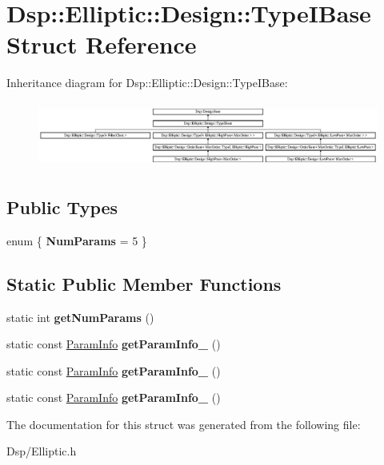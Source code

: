 \hypertarget{structDsp_1_1Elliptic_1_1Design_1_1TypeIBase}{\section{Dsp\-:\-:Elliptic\-:\-:Design\-:\-:Type\-I\-Base Struct Reference}
\label{structDsp_1_1Elliptic_1_1Design_1_1TypeIBase}
}
Inheritance diagram for Dsp\-:\-:Elliptic\-:\-:Design\-:\-:Type\-I\-Base\-:\begin{figure}[H]
\begin{center}
\leavevmode
\includegraphics[height=2.196079cm]{structDsp_1_1Elliptic_1_1Design_1_1TypeIBase}
\end{center}
\end{figure}
\subsection*{Public Types}
\begin{DoxyCompactItemize}
\item 
enum \{ {\bfseries Num\-Params} =  5
 \}
\end{DoxyCompactItemize}
\subsection*{Static Public Member Functions}
\begin{DoxyCompactItemize}
\item 
\hypertarget{structDsp_1_1Elliptic_1_1Design_1_1TypeIBase_a8675ff84e7f0573d60f0065511b155b4}{static int {\bfseries get\-Num\-Params} ()}\label{structDsp_1_1Elliptic_1_1Design_1_1TypeIBase_a8675ff84e7f0573d60f0065511b155b4}

\item 
\hypertarget{structDsp_1_1Elliptic_1_1Design_1_1TypeIBase_aea410ed62ad42e1727dadfebed68bafe}{static const \hyperlink{classDsp_1_1ParamInfo}{Param\-Info} {\bfseries get\-Param\-Info\-\_} ()}\label{structDsp_1_1Elliptic_1_1Design_1_1TypeIBase_aea410ed62ad42e1727dadfebed68bafe}

\item 
\hypertarget{structDsp_1_1Elliptic_1_1Design_1_1TypeIBase_a46078f7320b176cc3a68f366709ae674}{static const \hyperlink{classDsp_1_1ParamInfo}{Param\-Info} {\bfseries get\-Param\-Info\-\_} ()}\label{structDsp_1_1Elliptic_1_1Design_1_1TypeIBase_a46078f7320b176cc3a68f366709ae674}

\item 
\hypertarget{structDsp_1_1Elliptic_1_1Design_1_1TypeIBase_ab176b6e895920ff1589e4b85d5cc4b0a}{static const \hyperlink{classDsp_1_1ParamInfo}{Param\-Info} {\bfseries get\-Param\-Info\-\_} ()}\label{structDsp_1_1Elliptic_1_1Design_1_1TypeIBase_ab176b6e895920ff1589e4b85d5cc4b0a}

\end{DoxyCompactItemize}


The documentation for this struct was generated from the following file\-:\begin{DoxyCompactItemize}
\item 
Dsp/Elliptic.\-h\end{DoxyCompactItemize}

